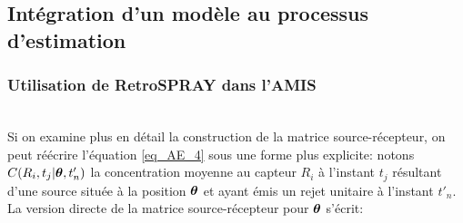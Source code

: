\subsection{Intégration d'un modèle  au processus d'estimation}

\subsubsection{Utilisation de RetroSPRAY dans l'AMIS}

  \\
%
%
%
%

Si on examine plus en détail la construction de la matrice source-récepteur, on peut réécrire l'équation \eqref{eq_AE_4} sous une forme plus explicite: notons $C(R_i,t_j |{\bm{\theta}}, t'_n)$ la concentration moyenne au capteur $R_i$ à l'instant $t_j$ résultant d'une source située à la position ${\bm{\theta}}$ et ayant émis un rejet unitaire à l'instant $t'_n$. La version directe  de la matrice source-récepteur pour ${\bm{\theta}}$ s'écrit:

